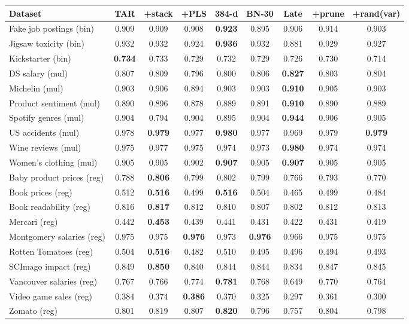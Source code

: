 \begin{tabular}{lcccccccc}
\toprule
Dataset & TAR & +stack & +PLS & 384-d & BN-30 & Late & +prune & +rand(var) \\
\midrule
Fake job postings (bin) & 0.909 & 0.909 & 0.908 & \textbf{0.923} & 0.895 & 0.906 & 0.914 & 0.903 \\
Jigsaw toxicity (bin) & 0.932 & 0.932 & 0.924 & \textbf{0.936} & 0.932 & 0.881 & 0.929 & 0.927 \\
Kickstarter (bin) & \textbf{0.734} & 0.733 & 0.729 & 0.732 & 0.729 & 0.726 & 0.730 & 0.714 \\
DS salary (mul) & 0.807 & 0.809 & 0.796 & 0.800 & 0.806 & \textbf{0.827} & 0.803 & 0.804 \\
Michelin (mul) & 0.903 & 0.906 & 0.894 & 0.903 & 0.903 & \textbf{0.910} & 0.905 & 0.903 \\
Product sentiment (mul) & 0.890 & 0.896 & 0.878 & 0.889 & 0.891 & \textbf{0.910} & 0.890 & 0.889 \\
Spotify genres (mul) & 0.904 & 0.794 & 0.904 & 0.895 & 0.904 & \textbf{0.944} & 0.906 & 0.905 \\
US accidents (mul) & 0.978 & \textbf{0.979} & 0.977 & \textbf{0.980} & 0.977 & 0.969 & 0.979 & \textbf{0.979} \\
Wine reviews (mul) & 0.975 & 0.977 & 0.975 & 0.974 & 0.973 & \textbf{0.980} & 0.974 & 0.974 \\
Women's clothing (mul) & 0.905 & 0.905 & 0.902 & \textbf{0.907} & 0.905 & \textbf{0.907} & 0.905 & 0.905 \\
Baby product prices (reg) & 0.788 & \textbf{0.806} & 0.799 & 0.802 & 0.799 & 0.766 & 0.793 & 0.770 \\
Book prices (reg) & 0.512 & \textbf{0.516} & 0.499 & \textbf{0.516} & 0.504 & 0.465 & 0.499 & 0.484 \\
Book readability (reg) & 0.816 & \textbf{0.817} & 0.812 & 0.810 & 0.807 & 0.802 & 0.812 & 0.813 \\
Mercari (reg) & 0.442 & \textbf{0.453} & 0.439 & 0.441 & 0.431 & 0.422 & 0.431 & 0.419 \\
Montgomery salaries (reg) & 0.975 & 0.975 & \textbf{0.976} & 0.973 & \textbf{0.976} & 0.966 & 0.975 & 0.975 \\
Rotten Tomatoes (reg) & 0.504 & \textbf{0.516} & 0.482 & 0.510 & 0.495 & 0.496 & 0.494 & 0.493 \\
SCImago impact (reg) & 0.849 & \textbf{0.850} & 0.840 & 0.844 & 0.844 & 0.834 & 0.847 & 0.845 \\
Vancouver salaries (reg) & 0.767 & 0.766 & 0.774 & \textbf{0.781} & 0.768 & 0.649 & 0.770 & 0.764 \\
Video game sales (reg) & 0.384 & 0.374 & \textbf{0.386} & 0.370 & 0.325 & 0.297 & 0.361 & 0.300 \\
Zomato (reg) & 0.801 & 0.819 & 0.807 & \textbf{0.820} & 0.796 & 0.757 & 0.804 & 0.798 \\
\bottomrule
\end{tabular}
